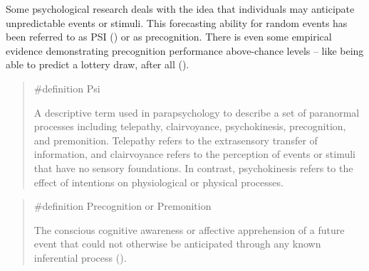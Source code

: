 \documentclass[
  letterpaper,
]{book}
\begin{document}
Some psychological research deals with the idea that individuals may
anticipate unpredictable events or stimuli. This forecasting ability for
random events has been referred to as PSI
() or as
precognition. There is even some empirical evidence demonstrating
precognition performance above-chance levels -- like being able to
predict a lottery draw, after all
().

\begin{quote}
\label{def-psi}{\#definition} Psi

A descriptive term used in parapsychology to describe a set of
paranormal processes including telepathy, clairvoyance, psychokinesis,
precognition, and premonition. Telepathy refers to the extrasensory
transfer of information, and clairvoyance refers to the perception of
events or stimuli that have no sensory foundations. In contrast,
psychokinesis refers to the effect of intentions on physiological or
physical processes.
\end{quote}

\begin{quote}
\label{def-precognition}{\#definition} Precognition or
Premonition

The conscious cognitive awareness or affective apprehension of a future
event that could not otherwise be anticipated through any known
inferential process ().
\end{quote}
\end{document}
